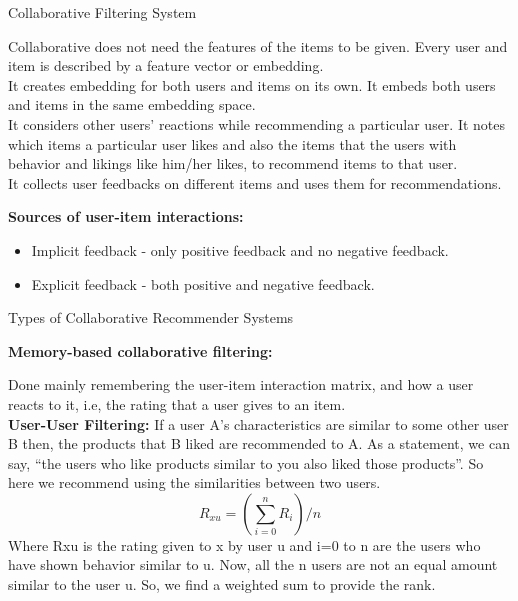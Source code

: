 \documentclass{beamer}
\newcommand\myheading[1]{%
  \par\bigskip
  {\large\bfseries#1}\par\smallskip}
\begin{document}
\begin{frame}{Collaborative Filtering System}
	\begin{flushleft}
		Collaborative does not need the features of the items to be given. Every user and item is described by a feature vector or embedding.\\
		\vspace{10pt}
		It creates embedding for both users and items on its own. It embeds both users and items in the same embedding space.\\
		\vspace{10pt}
		It considers other users’ reactions while recommending a particular user. It notes which items a particular user likes and also the items that the users with behavior and likings like him/her likes, to recommend items to that user.\\
		\vspace{10pt}
		It collects user feedbacks on different items and uses them for recommendations.
		\myheading{Sources of user-item interactions:}
		\begin{itemize}
			\item Implicit feedback -  only positive feedback and no negative feedback.
			\item Explicit feedback -  both positive and negative feedback.
		\end{itemize}
	\end{flushleft}
\end{frame}

\begin{frame}{Types of Collaborative Recommender Systems}
	\begin{flushleft}
	\myheading{Memory-based collaborative filtering:}
		Done mainly remembering the user-item interaction matrix, and how a user reacts to it, i.e, the rating that a user gives to an item.\\
		\vspace{10pt}
		\textbf{User-User Filtering:}
		If a user A’s characteristics are similar to some other user B then, the products that B liked are recommended to A. As a statement, we can say, “the users who like products similar to you also liked those products”. So here we recommend using the similarities between two users.
		\begin{equation*}
			R_{xu} = (\sum_{i=0}^{n} R_i) / n
		\end{equation*}
		Where Rxu is the rating given to x by user u and i=0 to n are the users who have shown behavior similar to u. Now, all the n users are not an equal amount similar to the user u. So, we find a weighted sum to provide the rank.
	\end{flushleft}
\end{frame}
\end{document}
